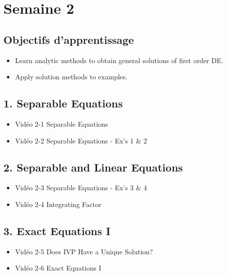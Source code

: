 \section*{Semaine 2}

\begin{multicols}{2}

\subsection*{Objectifs d'apprentissage}

\begin{itemize}[label={$\bullet$}]
  \item Learn analytic methods to obtain general solutions of first order DE.
  \item Apply solution methods to examples.
\end{itemize}

\subsection*{1. Separable Equations}

\begin{itemize}[label={$\bullet$}]
  \item Vidéo 2-1 Separable Equations
  \item Vidéo 2-2 Separable Equations - Ex's 1 \& 2
\end{itemize}

\subsection*{2. Separable and Linear Equations}

\begin{itemize}[label={$\bullet$}]
  \item Vidéo 2-3 Separable Equations - Ex's 3 \& 4
  \item Vidéo 2-4 Integrating Factor
\end{itemize}

\subsection*{3. Exact Equations I}

\begin{itemize}[label={$\bullet$}]
  \item Vidéo 2-5 Does IVP Have a Unique Solution?
  \item Vidéo 2-6 Exact Equations I
\end{itemize}


\end{multicols}
